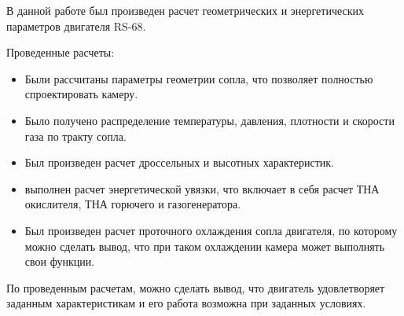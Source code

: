 
В данной работе был произведен расчет геометрических и энергетических 
параметров двигателя RS-68.  

Проведенные расчеты: 
\begin{itemize}
    \item Были  рассчитаны  параметры  геометрии сопла,  что  позволяет полностью спроектировать камеру. 
    \item Было получено распределение температуры, давления, плотности и скорости газа по тракту сопла.
    \item Был произведен расчет дроссельных и высотных характеристик.
    \item выполнен расчет энергетической  увязки, что включает в себя расчет ТНА окислителя, ТНА горючего и газогенератора.
    \item Был произведен расчет проточного охлаждения сопла двигателя, по которому можно сделать вывод, что при таком охлаждении камера может выполнять свои функции. 
\end{itemize}


По проведенным расчетам, можно сделать вывод, что двигатель удовлетворяет  заданным  характеристикам  и  его  работа  возможна  при заданных условиях. 
  
\clearpage